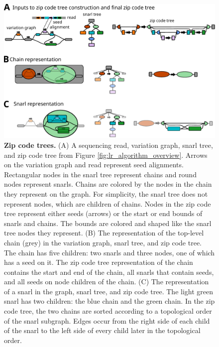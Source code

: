 \documentclass[11pt]{ucscthesis}
\begin{document}
\begin{figure}
    \centering
    \includegraphics[width=\columnwidth]{zip_tree_construction.pdf}
    \caption[Zip code trees]{\textbf{Zip code trees.} (A) A sequencing read, variation graph, snarl tree, and zip code tree from Figure \ref{fig:lr_algorithm_overview}. Arrows on the variation graph and read represent seed alignments. Rectangular nodes in the snarl tree represent chains and round nodes represent snarls. Chains are colored by the nodes in the chain they represent on the graph. For simplicity, the snarl tree does not represent nodes, which are children of chains. Nodes in the zip code tree represent either seeds (arrows) or the start or end bounds of snarls and chains. The bounds are colored and shaped like the snarl tree nodes they represent. (B) The representation of the top-level chain (grey) in the variation graph, snarl tree, and zip code tree. The chain has five children: two snarls and three nodes, one of which has a seed on it. The zip code tree representation of the chain contains the start and end of the chain, all snarls that contain seeds, and all seeds on node children of the chain. (C) The representation of a snarl in the graph, snarl tree, and zip code tree. The light green snarl has two children: the blue chain and the green chain. In the zip code tree, the two chains are sorted according to a topological order of the snarl subgraph. Edges occur from the right side of each child of the snarl to the left side of every child later in the topological order.}
    \label{fig:ziptree-methods}
\end{figure}
\end{document}
